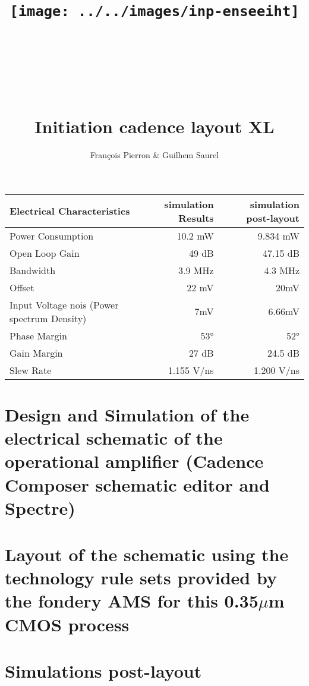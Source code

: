 \documentclass{article}
\title{\texttt{[image: ../../images/inp-enseeiht]} \\ ~ \\ ~ \\ ~ \\ ~ \\ Initiation cadence layout XL}
\author{François Pierron \& Guilhem Saurel}
\date{\oldstylenums{\today}}
\begin{document}
\begin{titlepage}
    \setcounter{page}{0}
    \maketitle
    \vfill
    \tableofcontents
    \thispagestyle{empty}
\end{titlepage}

\begin{tabular}{|l|r|r|}
    \hline
    Electrical Characteristics & simulation Results & simulation post-layout \\
    \hline
    Power Consumption & 10.2 mW & 9.834 mW \\
    \hline
    Open Loop Gain & 49 dB & 47.15 dB \\
    \hline
    Bandwidth & 3.9 MHz & 4.3 MHz \\
    \hline
    Offset & 22 mV & 20mV \\
    \hline
    Input Voltage nois (Power spectrum Density) & 7mV & 6.66mV \\
    \hline
    Phase Margin & 53° & 52° \\
    \hline
    Gain Margin & 27 dB & 24.5 dB \\
    \hline
    Slew Rate & 1.155 V/ns & 1.200 V/ns \\
    \hline
\end{tabular}

\section{Design and Simulation of the electrical schematic of the operational amplifier (Cadence Composer schematic editor and Spectre)}
\section{Layout of the schematic using the technology rule sets provided by the fondery AMS for this 0.35$\mu$m CMOS process}
\section{Simulations post-layout}
\end{document}
